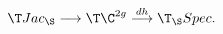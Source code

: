 \begin{equation}\label{ex2}
\T Jac_\S\longrightarrow\T \C^{2g}\stackrel{dh}\longrightarrow\T_\S Spec.
\end{equation}

